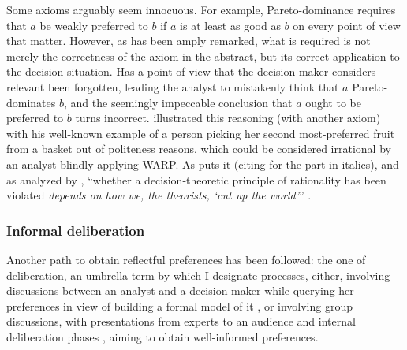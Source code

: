 \documentclass[version=last, pagesize, twoside=off, bibliography=totoc, DIV=calc, fontsize=12pt, a4paper, french, english]{scrartcl}
\begin{document}
Some axioms arguably seem innocuous. For example, Pareto-dominance requires that $a$ be weakly preferred to $b$ if $a$ is at least as good as $b$ on every point of view that matter. However, as has been amply remarked, what is required is not merely the correctness of the axiom in the abstract, but its correct application to the decision situation. Has a point of view that the decision maker considers relevant been forgotten, leading the analyst to mistakenly think that $a$ Pareto-dominates $b$, and the seemingly impeccable conclusion that $a$ ought to be preferred to $b$ turns incorrect. \citet{sen_maximisation_1997} illustrated this reasoning (with another axiom) with his well-known example of a person picking her second most-preferred fruit from a basket out of politeness reasons, which could be considered irrational by an analyst blindly applying WARP. As \citet[p.\ 40]{lecouteux_reconciling_2015} puts it (citing \citet[p.\ 13]{bacharach_beyond_2006} for the part in italics), and as analyzed by \citet{sen_information_1986, sen_internal_1993}, “whether a decision-theoretic principle of rationality has been violated \emph{depends on how we, the theorists, ‘cut up the world’}” .

\subsubsection{Informal deliberation}
Another path to obtain reflectful preferences has been followed: the one of deliberation, an umbrella term by which I designate processes, either, involving discussions between an analyst and a decision-maker while querying her preferences in view of building a formal model of it \citep{raiffa_back_1985, keeney_decisions_1993, roy_multicriteria_1996, belton_multiple_2002}, or involving group discussions, with presentations from experts to an audience and internal deliberation phases \citep{fishkin_when_2011}, aiming to obtain well-informed preferences. 
\end{document}
